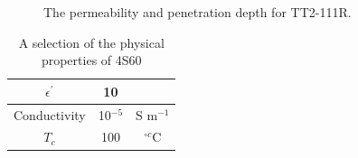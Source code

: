 \begin{figure}
\caption{The permeability  and penetration depth  for TT2-111R.}
\end{figure}

\begin{table}
\caption{A selection of the physical properties of 4S60}
\label{tab:4s60Prop}
\begin{center}
\begin{tabular}{c | c | c}
$\epsilon^{'}$ & 10 & \\ \hline
Conductivity  & 10$^{-5}$ & S m$^{-1}$\\ \hline
$T_{c}$ & 100 & $^{\circ c}$C \\
\end{tabular}
\end{center}
\end{table}

